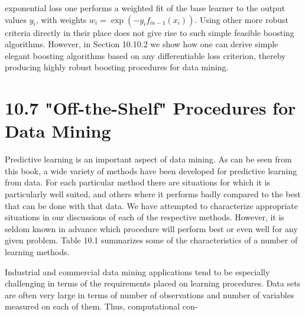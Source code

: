 \documentclass[10pt]{article}
\begin{document}
exponential loss one performs a weighted fit of the base learner to the output values $y_{i}$, with weights $w_{i}=\exp \left(-y_{i} f_{m-1}\left(x_{i}\right)\right)$. Using other more robust criteria directly in their place does not give rise to such simple feasible boosting algorithms. However, in Section 10.10.2 we show how one can derive simple elegant boosting algorithms based on any differentiable loss criterion, thereby producing highly robust boosting procedures for data mining.

\section*{10.7 "Off-the-Shelf" Procedures for Data Mining}
Predictive learning is an important aspect of data mining. As can be seen from this book, a wide variety of methods have been developed for predictive learning from data. For each particular method there are situations for which it is particularly well suited, and others where it performs badly compared to the best that can be done with that data. We have attempted to characterize appropriate situations in our discussions of each of the respective methods. However, it is seldom known in advance which procedure will perform best or even well for any given problem. Table 10.1 summarizes some of the characteristics of a number of learning methods.

Industrial and commercial data mining applications tend to be especially challenging in terms of the requirements placed on learning procedures. Data sets are often very large in terms of number of observations and number of variables measured on each of them. Thus, computational con-
\end{document}
